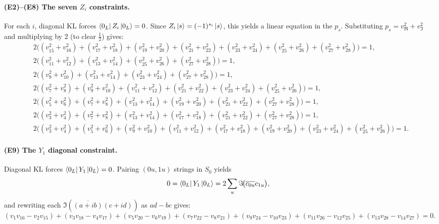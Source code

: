 \documentclass[11pt]{article}
\begin{document}
\paragraph{(E2)--(E8) The seven $Z_i$ constraints.}
For each $i$, diagonal KL forces $\bra{0_L}Z_i\ket{0_L}=0$.
Since $Z_i\ket{s}=(-1)^{s_i}\ket{s}$, this yields a linear equation in the $p_s$.
Substituting $p_s=v_{\Re}^2+v_{\Im}^2$ and multiplying by $2$ (to clear $\tfrac12$) gives:
\begin{align}
\label{eq:poly-Z1}
&2\Big((v_{15}^2+v_{16}^2)+(v_{17}^2+v_{18}^2)+(v_{19}^2+v_{20}^2)+(v_{21}^2+v_{22}^2)+(v_{23}^2+v_{24}^2)+(v_{25}^2+v_{26}^2)+(v_{27}^2+v_{28}^2)\Big)=1,\tag{E2}\\
\label{eq:poly-Z2}
&2\Big((v_{11}^2+v_{12}^2)+(v_{13}^2+v_{14}^2)+(v_{25}^2+v_{26}^2)+(v_{27}^2+v_{28}^2)\Big)=1,\tag{E3}\\
\label{eq:poly-Z3}
&2\Big((v_{9}^2+v_{10}^2)+(v_{13}^2+v_{14}^2)+(v_{23}^2+v_{24}^2)+(v_{27}^2+v_{28}^2)\Big)=1,\tag{E4}\\
\label{eq:poly-Z4}
&2\Big((v_{7}^2+v_{8}^2)+(v_{9}^2+v_{10}^2)+(v_{11}^2+v_{12}^2)+(v_{21}^2+v_{22}^2)+(v_{23}^2+v_{24}^2)+(v_{25}^2+v_{26}^2)\Big)=1,\tag{E5}\\
\label{eq:poly-Z5}
&2\Big((v_{5}^2+v_{6}^2)+(v_{7}^2+v_{8}^2)+(v_{13}^2+v_{14}^2)+(v_{19}^2+v_{20}^2)+(v_{21}^2+v_{22}^2)+(v_{27}^2+v_{28}^2)\Big)=1,\tag{E6}\\
\label{eq:poly-Z6}
&2\Big((v_{3}^2+v_{4}^2)+(v_{7}^2+v_{8}^2)+(v_{13}^2+v_{14}^2)+(v_{17}^2+v_{18}^2)+(v_{21}^2+v_{22}^2)+(v_{27}^2+v_{28}^2)\Big)=1,\tag{E7}\\
\label{eq:poly-Z7}
&2\Big((v_{3}^2+v_{4}^2)+(v_{5}^2+v_{6}^2)+(v_{9}^2+v_{10}^2)+(v_{11}^2+v_{12}^2)+(v_{17}^2+v_{18}^2)+(v_{19}^2+v_{20}^2)+(v_{23}^2+v_{24}^2)+(v_{25}^2+v_{26}^2)\Big)=1.\tag{E8}
\end{align}

\paragraph{(E9) The $Y_1$ diagonal constraint.}
Diagonal KL forces $\bra{0_L}Y_1\ket{0_L}=0$.
Pairing $(0u,1u)$ strings in $S_0$ yields
\[
0=\bra{0_L}Y_1\ket{0_L}=2\sum_u \Im\!\bigl(\overline{c_{0u}}c_{1u}\bigr),
\]
and rewriting each $\Im(\overline{(a+ib)}(c+id))$ as $ad-bc$ gives:
\begin{equation}
\label{eq:poly-Y1}
(v_1v_{16}-v_2v_{15})+(v_3v_{18}-v_4v_{17})+(v_5v_{20}-v_6v_{19})+(v_7v_{22}-v_8v_{21})
+(v_9v_{24}-v_{10}v_{23})+(v_{11}v_{26}-v_{12}v_{25})+(v_{13}v_{28}-v_{14}v_{27})=0.
\tag{E9}
\end{equation}
\end{document}

